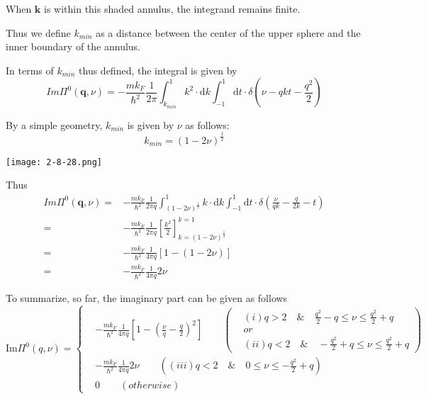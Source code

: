 When $\mathbf{k}$ is within this shaded annulus, the integrand remains finite.

Thus we define $k_{min}$ as a distance between the center of the upper sphere and the inner boundary of the annulus.

In terms of $k_{min}$ thus defined, the integral is given by
\[ Im\Pi^0(\mathbf{q},\nu) = - \frac{m k_F}{\hbar^2}\frac{1}{2\pi} \int_{k_{min}}^1 k^2  \cdot \mathrm{d} k \int_{-1}^1 \mathrm{d} t \cdot \delta(\nu-qkt-\frac{q^2}{2})\]

By a simple geometry, $k_{min}$ is given by $\nu$ as follows:
\[ k_{min} = (1-2\nu)^{\frac{1}{2}} \]
\begin{center}\label{Fig2.8.28}
\texttt{[image: 2-8-28.png]}
\end{center}

Thus
\begin{equation} \label{Eqs2.8.23} \begin{split}
 Im\Pi^0(\mathbf{q},\nu) =& - \frac{m k_F}{\hbar^2}\frac{1}{2\pi q} \int_{(1-2\nu)^{\frac{1}{2}}}^1 k  \cdot \mathrm{d} k \int_{-1}^1 \mathrm{d} t \cdot \delta(\frac{\nu}{qk}-\frac{q}{2 k}-t)\\
=& - \frac{m k_F}{\hbar^2}\frac{1}{2\pi q} \left[ \frac{k^2}{2} \right]_{k=(1-2\nu)^{\frac{1}{2}}}^{k=1}\\
=& - \frac{m k_F}{\hbar^2}\frac{1}{4\pi q} \left[ 1 - (1-2\nu) \right]\\
=& - \frac{m k_F}{\hbar^2}\frac{1}{4\pi q} 2\nu
\end{split}\end{equation}

To summarize, so far, the imaginary part can be given as follows
\begin{equation} \label{Eqs2.8.24}
\text{Im} \Pi^0(q,\nu) = \left\{ \begin{split}
&-\frac{m k_F}{\hbar^2} \frac{1}{4\pi q} \left[ 1-\left( \frac{\nu}{q} - \frac{q}{2} \right)^2 \right] \qquad \left( \begin{split}
&(i) q > 2 \quad\&\quad \frac{q^2}{2} - q\leq \nu \leq \frac{q^2}{2} + q\\
&or\\
&(ii) q < 2 \quad\&\quad -\frac{q^2}{2} + q \leq \nu \leq \frac{q^2}{2} + q
\end{split}  \right)\\
&-\frac{m k_F}{\hbar^2} \frac{1}{4\pi q} 2\nu \qquad 
\left( (iii) q < 2 \quad\&\quad 0 \leq \nu \leq -\frac{q^2}{2}+q \right)\\
&0\qquad  (otherwise)
\end{split} \right.
\end{equation}

